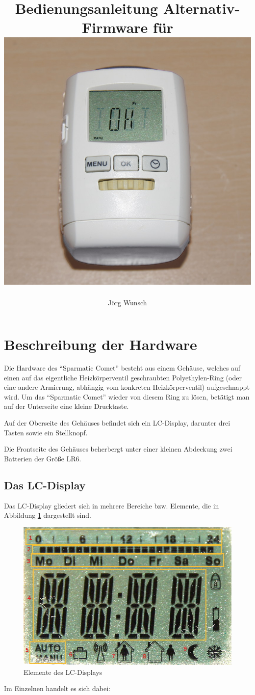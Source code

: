 \documentclass[a5paper,twoside]{article}
\title {
  Bedienungsanleitung Alternativ-Firmware für \SC\\
  \vspace*{1ex}
  {\centering\includegraphics[width=0.63\linewidth]{Comet.jpg}}
}
\author {
Jörg Wunsch
}
\newcommand\SC{"`Sparmatic Comet"'}
\begin{document}
\maketitle
\thispagestyle{empty}
\pagebreak
\cleardoublepage

\tableofcontents

\section {
Beschreibung der Hardware
}

Die Hardware des \SC{} besteht aus einem Gehäuse, welches auf einen
auf das eigentliche Heizkörperventil geschraubten Polyethylen-Ring
(oder eine andere Armierung, abhängig vom konkreten Heizkörperventil)
aufgeschnappt wird.  Um das \SC{} wieder von diesem Ring zu lösen,
betätigt man auf der Unterseite eine kleine Drucktaste.

Auf der Oberseite des Gehäuses befindet sich ein LC-Display, darunter
drei Tasten sowie ein Stellknopf.

Die Frontseite des Gehäuses beherbergt unter einer kleinen Abdeckung zwei
Batterien der Größe LR6.

\subsection {
  Das LC-Display
}

Das LC-Display gliedert sich in mehrere Bereiche bzw. Elemente, die in
Abbildung \ref{fig:LCD} dargestellt sind.

\begin{figure}[h]
\centering\includegraphics[width=0.7\linewidth]{LCD.jpg}
\caption{Elemente des LC-Displays}
\label{fig:LCD}
\end{figure}

Im Einzelnen handelt es sich dabei:
\end{document}
